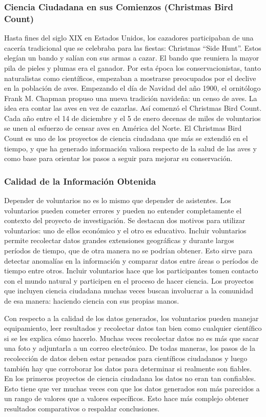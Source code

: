\subsubsection{Ciencia Ciudadana en sus Comienzos (Christmas Bird Count)}
	Hasta fines del siglo XIX en Estados Unidos, los cazadores participaban de una cacería tradicional que se celebraba para las fiestas: Christmas ``Side Hunt''. Estos elegían un bando y salían con sus armas a cazar. El bando que reuniera la mayor pila de pieles y plumas era el ganador. Por esta época los conservacionistas, tanto naturalistas como científicos, empezaban a mostrarse preocupados por el declive en la población de aves. Empezando el día de Navidad del año 1900, el ornitólogo Frank M. Chapman propuso una nueva tradición navideña: un censo de aves. La idea era contar las aves en vez de cazarlas. Así comenzó el Christmas Bird Count. Cada año entre el 14 de diciembre y el 5 de enero decenas de miles de voluntarios se unen al esfuerzo de censar aves en América del Norte. El Christmas Bird Count es uno de los proyectos de ciencia ciudadana que más se extendió en el tiempo, y que ha generado información valiosa respecto de la salud de las aves y como base para orientar los pasos a seguir para mejorar su conservación. \cite{CBC}
	
\subsubsection{Calidad de la Información Obtenida}	

Depender de voluntarios no es lo mismo que depender de asistentes. Los voluntarios pueden cometer errores y pueden no entender completamente el contexto del proyecto de investigación. Se destacan dos motivos para utilizar voluntarios: uno de ellos económico y el otro es educativo. Incluir voluntarios permite recolectar datos grandes extensiones geográficas y durante largos períodos de tiempo, que de otra manera no se podrían obtener. Esto sirve para detectar anomalías en la información y comparar datos entre áreas o períodos de tiempo entre otros. Incluir voluntarios hace que los participantes tomen contacto con el mundo natural y participen en el proceso de hacer ciencia. Los proyectos que incluyen ciencia ciudadana muchas veces buscan involucrar a la comunidad de esa manera: haciendo ciencia con sus propias manos.

Con respecto a la calidad de los datos generados, los voluntarios pueden manejar equipamiento, leer resultados y recolectar datos tan bien como cualquier científico si se les explica cómo hacerlo. Muchas veces recolectar datos no es más que sacar una foto y adjuntarla a un correo electrónico. De todas maneras, los pasos de la recolección de datos deben estar pensados para científicos ciudadanos y luego también hay que corroborar los datos para determinar si realmente son fiables. En los primeros proyectos de ciencia ciudadana los datos no eran tan confiables. Esto tiene que ver muchas veces con que los datos generados son más parecidos a un rango de valores que a valores específicos. Esto hace más complejo obtener resultados comparativos o respaldar conclusiones. 
	

